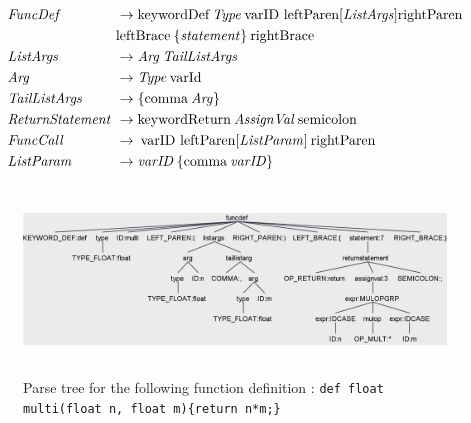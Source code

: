 \begin{align*}
    \omit $\mathit{FuncDef}$ \hfil &\rightarrow \text{keywordDef} \: \mathit{Type} \: \text{varID leftParen} [\mathit{ListArgs}] \text{rightParen} \\
    & \text{leftBrace} \: \{ \mathit{statement} \} \: \text{rightBrace} \\
    \omit $\mathit{ListArgs}$ \hfil &\rightarrow \mathit{Arg} \:  \mathit{TailListArgs} \\
    \omit $\mathit{Arg}$ \hfil &\rightarrow \mathit{Type} \: \text{varId} \\
    \omit $\mathit{TailListArgs}$ \hfil & \rightarrow \{ \text{comma} \: \mathit{Arg} \} \\
    \omit $\mathit{ReturnStatement}$ \hfil &\rightarrow \text{keywordReturn} \: \mathit{AssignVal} \: \text{semicolon} \\
    \omit $\mathit{FuncCall}$ \hfil &\rightarrow \: \text{varID leftParen} [\mathit{ListParam}] \: \text{rightParen} \\
    \omit $\mathit{ListParam}$ \hfil &\rightarrow \mathit{varID} \:  \{ \text{comma} \: \mathit{varID} \}
\end{align*}

\begin{figure}[H]
    \centering
    \includegraphics[height = 5cm]{figures/parse_trees/parseTree_funcdef}
    \caption{Parse tree for the following function definition : \texttt{def float multi(float n, float m)\{return n*m;\}} }
    \label{fig:parseTree_funcdef}
\end{figure}


